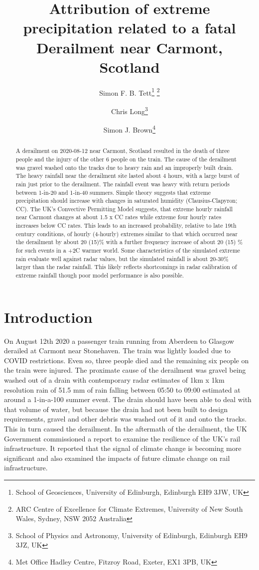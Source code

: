 \documentclass[11pt,a4paper]{article}
\title{Attribution of extreme precipitation related to a fatal Derailment  near Carmont, Scotland}
\author{Simon F. B. Tett\thanks{School of Geosciences, University of Edinburgh, Edinburgh EH9 3JW, UK} \thanks{ARC Centre of Excellence for Climate Extremes,
University of New South Wales,
Sydney, NSW 2052 Australia}
	\and 
Chris Long\thanks{School of Physics and Astronomy, University of Edinburgh, Edinburgh EH9 3JZ, UK}
\and 
Simon J. Brown\thanks{Met Office Hadley Centre, Fitzroy Road, Exeter, EX1 3PB, UK}}
\begin{document}
	
\maketitle

\graphicspath{{figures/}}


\begin{abstract}
	A derailment on 2020-08-12 near Carmont, Scotland resulted in the death of three people and the injury of the other 6 people on the train. The cause of the derailment was gravel washed onto the tracks due to heavy rain and an improperly built drain.  The heavy rainfall near the derailment site lasted about 4 hours, with a large burst of  rain just prior to the derailment. The rainfall event was heavy with return  periods between 1-in-20  and 1-in-40 summers. Simple theory suggests that extreme precipitation should increase with changes in saturated humidity (Clausius-Clapyron; CC). The UK's Convective Permitting Model suggests, that extreme hourly rainfall near Carmont changes at  about 1.5 x CC rates while extreme four hourly rates increases below  CC rates. This leads to an increased probability, relative to late 19th century conditions,  of hourly (4-hourly) extremes similar to that which occurred near the derailment by about 20 (15)\% with a further frequency increase of about 20 (15)  \% for such events in a +2C warmer world. Some characteristics of the simulated extreme rain evaluate well against radar values, but the  simulated rainfall is about 20-30\% larger than the radar rainfall. This likely reflects shortcomings in  radar  calibration of extreme rainfall though poor  model performance is also possible. 
\end{abstract}



\section{Introduction}
\label{sect:Intro}

On August 12th 2020 a passenger train running from Aberdeen to Glasgow derailed at Carmont near Stonehaven. The train was lightly loaded due to COVID restrictions. Even so,  three people died and the remaining six people on the train  were injured. The proximate cause of the derailment was gravel being washed out of a drain with contemporary radar estimates of 1km x 1km resolution rain of 51.5 mm of rain falling between 05:50 to 09:00  estimated at around a 1-in-a-100 summer event\parencite{carmontReport2024}. The drain should have been able to deal with that volume of water, but because the drain had not been built to design requirements, gravel and other debris was washed out of it and onto the tracks. This in turn caused the derailment. In the aftermath of the derailment, the UK Government commissioned a report to examine the resilience of the UK's rail infrastructure\parencite{NR_DfT_2021}. It reported that the signal of climate change is becoming more significant and also examined the impacts of future climate change  on rail infrastructure.
\end{document}
